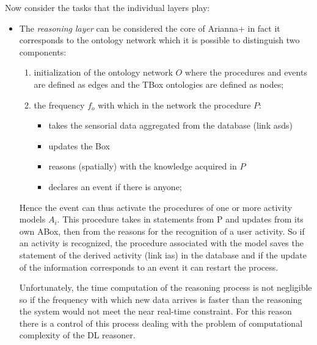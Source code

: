 \documentclass{thesisreport}
\begin{document}
 Now consider the tasks that the individual layers play:
 \begin{itemize}
     \item The \textit{reasoning layer} can be considered the core of Arianna+ in fact it corresponds to the ontology network which it is possible to distinguish two components:
     \begin{enumerate}
         \item initialization of the ontology network $O$ where the procedures and events are defined as edges and the TBox ontologies are defined as nodes;
         \item the frequency $f_o$ with which in the network the procedure $P$:
         \begin{itemize}
             \item takes the sensorial data aggregated from the database (link asds)
             \item updates the Box
             \item reasons (spatially) with the knowledge acquired in $P$
             \item declares an event if there is anyone;
         \end{itemize}
     \end{enumerate}
     Hence the event can thus activate the procedures of one or more activity models $A_i$. This procedure takes in statements from P and updates from its own ABox, then from the reasons for the recognition of a user activity.
     So if an activity is recognized, the procedure associated with the model saves the statement of the derived activity (link ias) in the database and if the update of the information corresponds to an event it can restart the process.
     
     Unfortunately, the time computation of the reasoning process is not negligible so if the frequency with which new data arrives is faster than the reasoning the system would not meet the near real-time constraint.
     For this reason there is a control of this process dealing with the problem of computational complexity of the DL reasoner.
     

\end{itemize}
\end{document}
